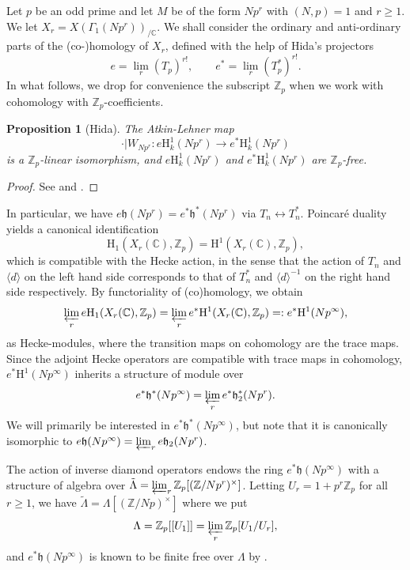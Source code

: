\documentclass[12pt]{amsart}
\newcommand\bC{\mathbb{C}}
\newcommand\bZ{\mathbb{Z}}
\newcommand\Zp{{\mathbb{Z}_p}}
\newcommand\gh{\mathfrak{h}}
\newcommand{\HH}{\mathrm{H}}
\theoremstyle{defstyle}
\theoremstyle{thmstyle}
\newtheorem{proposition}[subsubsection]{Proposition}
\begin{document}
Let $p$ be an odd prime and let $M$ be of the form $Np^r$ with $(N,p)=1$ and $r\geq 1$. We let $X_r=X(\Gamma_1(Np^r))_{/\bC}$. We shall consider the ordinary and anti-ordinary parts of the (co-)homology of $X_r$, defined with the help of Hida's projectors
\[ e=\lim_r (T_p)^{r!}, \qquad e^*=\lim_r (T^*_p)^{r!}.\]
In what follows, we drop for convenience the subscript $\Zp$ when we work with cohomology with $\Zp$-coefficients.
\begin{proposition}[Hida]\label{prop:hida}
	The Atkin-Lehner map 
	\[\cdot |W_{Np^r} \colon e\HH^1_k(Np^r)\to e^*\HH^1_k(Np^r)\]
	is a $\Zp$-linear isomorphism, and $e\HH^1_k(Np^r)$ and $e^*\HH^1_k(Np^r)$ are $\Zp$-free.
\end{proposition}
\begin{proof}
	See \cite[Corollary 3.2]{hidamodules} and \cite[(2.4) p.347]{hidamodules}.
\end{proof}
In particular, we have $e\gh(Np^r)=e^*\gh^*(Np^r)$ via $T_n \leftrightarrow T^*_n$.
Poincaré duality yields a canonical identification 
\[ \HH_1(X_r(\bC),\Zp) = \HH^1 (X_r(\bC),\Zp), \]
which is compatible with the Hecke action, in the sense that the action of $T_n$ and $\langle d \rangle$ on the left hand side corresponds to that of $T_n^*$ and $\langle d \rangle^{-1}$ on the right hand side respectively. By functoriality of (co)homology, we obtain 
\[ \varprojlim_r e \HH_1(X_r(\bC),\Zp) =\varprojlim_r e^* \HH^1 (X_r(\bC),\Zp) =: e^* \HH^1 (Np^\infty), \]
as Hecke-modules, where the transition maps on cohomology are the trace maps. Since the adjoint Hecke operators are compatible with trace maps in cohomology, $e^* \HH^1 (Np^\infty)$ inherits a structure of module over 
\[e^*\gh^*(Np^\infty)=\varprojlim_r e^*\gh_2^*(Np^r).\]
We will primarily be interested in $e^*\gh^*(Np^\infty)$, but note that it is canonically isomorphic to $e\gh(Np^\infty)=\varprojlim_r e\gh_2(Np^r)$. 

The action of inverse diamond operators endows the ring $e^*\gh(Np^\infty)$ with a structure of algebra over $\tilde{\Lambda}=\varprojlim_r\Zp[(\bZ/Np^r)^\times]$. Letting $U_r=1+p^r\Zp$ for all $r\geq 1$, we have $\tilde{\Lambda}=\Lambda[(\bZ/Np)^\times]$ where we put 
\[\Lambda=\Zp[[U_1]]=\varprojlim_r \Zp[U_1/U_r],\]
and $e^*\gh(Np^\infty)$ is known to be finite free over $\Lambda$ by \cite[Thm. 3.1]{hida1986galois}.
\end{document}
